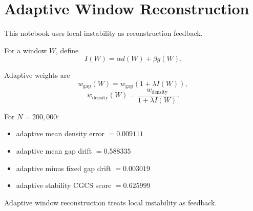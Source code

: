 \section*{Adaptive Window Reconstruction}

This notebook uses local instability as reconstruction feedback.

For a window $W$, define
\[
I(W)=\alpha d(W)+\beta g(W).
\]

Adaptive weights are
\[
w_{\mathrm{gap}}(W)=w_{\mathrm{gap}}\left(1+\lambda I(W)\right),
\]
\[
w_{\mathrm{density}}(W)=\frac{w_{\mathrm{density}}}{1+\lambda I(W)}.
\]

For $N=200,000$:
\begin{itemize}
  \item adaptive mean density error $= 0.009111$
  \item adaptive mean gap drift $= 0.588335$
  \item adaptive minus fixed gap drift $= 0.003019$
  \item adaptive stability CGCS score $= 0.625999$
\end{itemize}

Adaptive window reconstruction treats local instability as feedback.
